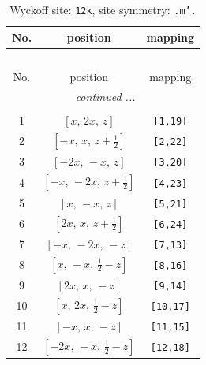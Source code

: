\documentclass[fleqn,8pt]{jsarticle}
\begin{document}
\begin{longtable}{ccc}
\caption{Wyckoff site: {\tt 12k}, site symmetry: {\tt .m'.}}
 \\
 \hline \hline
No. & position & mapping \\ \hline \endfirsthead

\multicolumn{2}{l}{\tablename\ \thetable{}} \\
 \hline \hline
No. & position & mapping \\ \hline \endhead

 \hline \hline
\multicolumn{2}{r}{\footnotesize\it continued ...} \\ \endfoot

 \hline \hline
\multicolumn{2}{r}{} \\ \endlastfoot

1 & $\left[ x,\, 2 x,\, z \right]$ & {\tt [1,19]} \\ \hline
2 & $\left[ - x,\, x,\, z + \frac{1}{2} \right]$ & {\tt [2,22]} \\ \hline
3 & $\left[ - 2 x,\, - x,\, z \right]$ & {\tt [3,20]} \\ \hline
4 & $\left[ - x,\, - 2 x,\, z + \frac{1}{2} \right]$ & {\tt [4,23]} \\ \hline
5 & $\left[ x,\, - x,\, z \right]$ & {\tt [5,21]} \\ \hline
6 & $\left[ 2 x,\, x,\, z + \frac{1}{2} \right]$ & {\tt [6,24]} \\ \hline
7 & $\left[ - x,\, - 2 x,\, - z \right]$ & {\tt [7,13]} \\ \hline
8 & $\left[ x,\, - x,\, \frac{1}{2} - z \right]$ & {\tt [8,16]} \\ \hline
9 & $\left[ 2 x,\, x,\, - z \right]$ & {\tt [9,14]} \\ \hline
10 & $\left[ x,\, 2 x,\, \frac{1}{2} - z \right]$ & {\tt [10,17]} \\ \hline
11 & $\left[ - x,\, x,\, - z \right]$ & {\tt [11,15]} \\ \hline
12 & $\left[ - 2 x,\, - x,\, \frac{1}{2} - z \right]$ & {\tt [12,18]} \\
\end{longtable}
\renewcommand{\arraystretch}{1.2}
\end{document}
